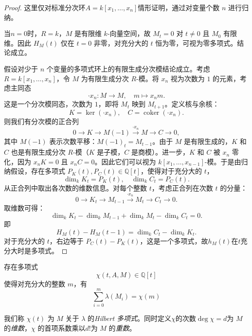 \documentclass[12pt,a4paper]{ctexrep}   %
\begin{document}
\begin{proof}
    这里仅对标准分次环$A=k[x_1, \dots, x_n]$情形证明，通过对变量个数 \( n \) 进行归纳。

    当$n = 0 $时，\( R = k \)，\( M \) 是有限维 \( k \)-向量空间，故 \( M_t = 0 \) 对 \( t \neq 0 \) 且 \( M_0 \) 有限维。因此 \( H_M(t) \) 仅在 \( t = 0 \) 非零，对充分大的 \( t \) 恒为零，可视为零多项式。结论成立。

    假设对少于 \( n \) 个变量的多项式环上的有限生成分次模结论成立。考虑 \( R = k[x_1, \dots, x_n] \)，令 \( M \) 为有限生成分次 \( R \)-模。将 \( x_n \) 视为次数为 \( 1 \) 的元素，考虑主同态
    \[
        \cdot x_n : M \to M, \quad m \mapsto x_n m.
    \]
    这是一个分次模同态，次数为 \( 1 \)，即将 \( M_t \) 映到 \( M_{t+1} \)。定义核与余核：
    \[
        K = \ker(\cdot x_n), \quad C = \operatorname{coker}(\cdot x_n).
    \]
    则我们有分次模的正合列
    \[
        0 \to K \to M(-1) \xrightarrow{\cdot x_n} M \to C \to 0,
    \]
    其中 \( M(-1) \) 表示次数平移：\( M(-1)_t = M_{t-1} \)。由于 \( M \) 是有限生成的，\( K \) 和 \( C \) 也是有限生成分次 \( R \)-模（\( K \) 是子模，\( C \) 是商模）。进一步，\( K \) 和 \( C \) 被 \( x_n \) 零化，因为 \( x_n K = 0 \) 且 \( x_n C = 0 \)。因此它们可以视为 \( k[x_1, \dots, x_{n-1}] \)-模。于是由归纳假设，存在多项式 \( P_K(t), P_C(t) \in \mathbb{Q}[t] \)，使得对于充分大的 \( t \)，
    \[
        \dim_k K_t = P_K(t), \quad \dim_k C_t = P_C(t).
    \]
    从正合列中取出各次数的维数信息。对每个整数 \( t \)，考虑正合列在次数 \( t \) 的分量：
    \[
        0 \to K_t \to M_{t-1} \xrightarrow{\cdot x_n} M_t \to C_t \to 0.
    \]
    取维数可得：
    \[
        \dim_k K_t - \dim_k M_{t-1} + \dim_k M_t - \dim_k C_t = 0.
    \]
    即
    \[
        H_M(t) - H_M(t-1) = \dim_k C_t - \dim_k K_t.
    \]
    对于充分大的 \( t \)，右边等于 \( P_C(t) - P_K(t) \)，这是一个多项式，故$h_M(t)$在$t$充分大时是多项式。
\end{proof}



\begin{corollary}
    存在多项式
    \[
        \chi(t,A,M)\in\mathbb{Q}[t]
    \]
    使得对充分大的整数 $m$，有
    \[
        \sum_{i=0}^{m}
        \lambda(M_i)
        =
        \chi(m)
    \]
\end{corollary}
我们称 $\chi(t)$ 为 $M$ 关于 $\lambda$ 的\emph{Hilbert 多项式}。同时定义$\chi$的次数$\deg \chi=d$为 $M$ 的\emph{维数}，$\chi$ 的首项系数乘以$d!$为 $M$ 的\emph{重数}。
\end{document}
